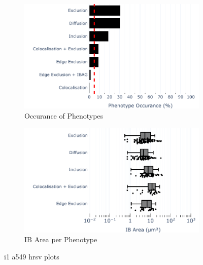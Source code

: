 \begin{figure}
    \begin{subfigure}{0.5\textwidth}
        \includegraphics[width=1\linewidth]{09. Chapter 4/Figs/02. Infection/01. IFIT1/01. bar_i1_a549.pdf} 
        \caption[]{Occurance of Phenotypes}
    \end{subfigure}
    \begin{subfigure}{0.5\textwidth}
        \includegraphics[width=1\linewidth]{09. Chapter 4/Figs/02. Infection/01. IFIT1/02. box_i1_a549.pdf}
        \caption[]{IB Area per Phenotype}
    \end{subfigure}
    \caption[i1 a549 hrsv plots]{i1 a549 hrsv plots}
    \label{fig:i1 a549 hrsv plots}
\end{figure}


